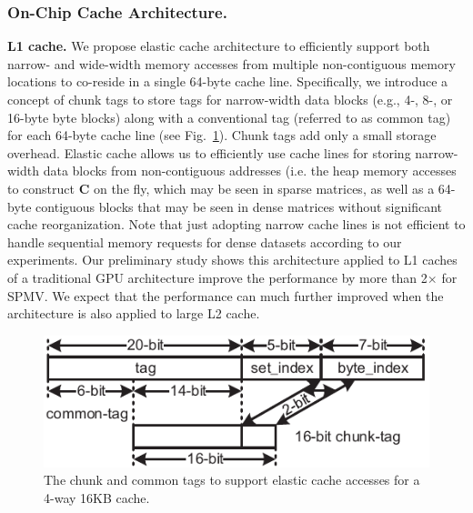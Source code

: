 \subsubsection{On-Chip Cache Architecture.} 
\label{sec:memory:on-chip}
\noindent
\textbf{L1 cache.}
We propose elastic cache architecture to efficiently support both narrow- and wide-width memory accesses from multiple non-contiguous memory locations to co-reside in a single 64-byte cache line. 
Specifically, we introduce a concept of chunk tags to store tags for narrow-width data blocks (e.g., 4-, 8-, or 16-byte byte blocks) along with a conventional tag (referred to as common tag) for each 64-byte cache line (see Fig.~\ref{fig:elastic-cache}). 
Chunk tags add only a small storage overhead. 
Elastic cache allows us to efficiently use cache lines for storing narrow-width data blocks from non-contiguous addresses (i.e. the heap memory accesses to construct \textbf{C} on the fly, 
which may be seen in sparse matrices, as well as a 64-byte contiguous blocks that may be seen in dense matrices without significant cache reorganization. 
Note that just adopting narrow cache lines is not efficient to handle sequential memory requests for dense datasets according to our experiments.
Our preliminary study shows this architecture applied to L1 caches of a traditional GPU architecture improve the performance by more than 2$\times$ for SPMV.
We expect that the performance can much further improved when the architecture is also applied to large L2 cache.



\begin{figure}
\center
\includegraphics[width=1.0\linewidth]{./fig/chunk_tag_16bit-eps-converted-to.pdf}
\caption{The chunk and common tags to support elastic cache accesses for a 4-way 16KB cache.}
\label{fig:elastic-cache}
\end{figure}


